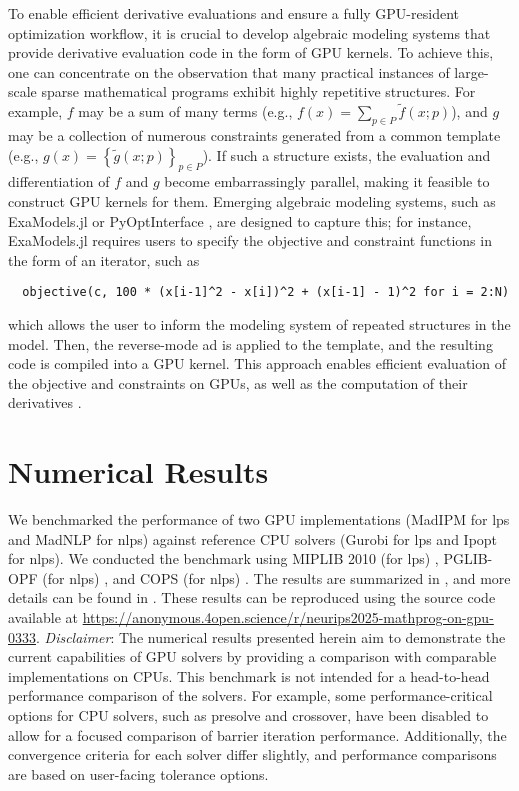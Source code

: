 \documentclass{article}
\begin{document}
To enable efficient derivative evaluations and ensure a fully GPU-resident optimization workflow, it is crucial to develop algebraic modeling systems that provide derivative evaluation code in the form of GPU kernels. To achieve this, one can concentrate on the observation that many practical instances of large-scale sparse mathematical programs exhibit highly repetitive structures. For example, $f$ may be a sum of many terms (e.g., $f(x) = \sum_{p\in P} \widetilde{f}(x; p)$), and $g$ may be a collection of numerous constraints generated from a common template (e.g., $g(x) = \left\{\widetilde{g}(x; p)\right\}_{p\in P}$). If such a structure exists, the evaluation and differentiation of $f$ and $g$ become embarrassingly parallel, making it feasible to construct GPU kernels for them. Emerging algebraic modeling systems, such as ExaModels.jl \cite{shinAcceleratingOptimalPower2024} or PyOptInterface \cite{yangPyOptInterfaceDesignImplementation2024}, are designed to capture this; for instance, ExaModels.jl requires users to specify the objective and constraint functions in the form of an iterator, such as
\begin{verbatim}
  objective(c, 100 * (x[i-1]^2 - x[i])^2 + (x[i-1] - 1)^2 for i = 2:N)
\end{verbatim}
which allows the user to inform the modeling system of repeated structures in the model. Then, the reverse-mode \gls*{ad} is applied to the template, and the resulting code is compiled into a GPU kernel. This approach enables efficient evaluation of the objective and constraints on GPUs, as well as the computation of their derivatives \cite{shinAcceleratingOptimalPower2024}.




\section{Numerical Results}\label{eqn:num}
We benchmarked the performance of two GPU implementations (MadIPM for \glspl*{lp} and MadNLP for \glspl*{nlp}) against reference CPU solvers (Gurobi for \glspl*{lp} and Ipopt for \glspl*{nlp}). We conducted the benchmark using MIPLIB 2010 (for \glspl*{lp}) \cite{kochMIPLIB20102011}, PGLIB-OPF (for \glspl*{nlp}) \cite{babaeinejadsarookolaeePowerGridLibrary2021}, and COPS (for \glspl*{nlp}) \cite{dolanBenchmarkingOptimizationSoftware2001}. The results are summarized in , and more details can be found in . These results can be reproduced using the source code available at \url{https://anonymous.4open.science/r/neurips2025-mathprog-on-gpu-0333}. \textit{Disclaimer}: The numerical results presented herein aim to demonstrate the current capabilities of GPU solvers by providing a comparison with comparable implementations on CPUs. This benchmark is not intended for a head-to-head performance comparison of the solvers. For example, some performance-critical options for CPU solvers, such as presolve and crossover, have been disabled to allow for a focused comparison of barrier iteration performance. Additionally, the convergence criteria for each solver differ slightly, and performance comparisons are based on user-facing tolerance options.
\end{document}
